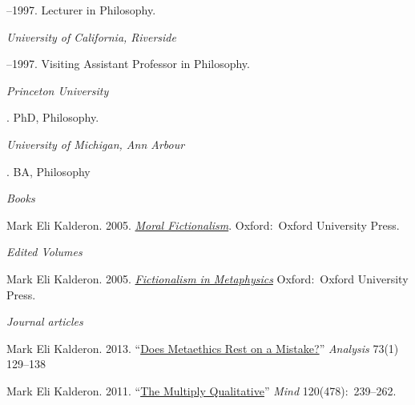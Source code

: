 \documentclass[11pt]{article}
\begin{document}
--1997. Lecturer in Philosophy.

\medskip
\noindent\emph{University of California, Riverside \vspace{0.01in}}

--1997. Visiting Assistant Professor in Philosophy.


\bigskip



\noindent\emph{Princeton University \vspace{0.01in}}

. PhD, Philosophy.

\medskip
\noindent\emph{University of Michigan, Ann Arbour\vspace{0.02in}}

. BA, Philosophy

\bigskip
 
\medskip
\noindent\emph{Books \vspace{0.01in}}

\ind  Mark Eli Kalderon. 2005. \emph{\href{http://ukcatalogue.oup.com/product/9780199275977.do}{Moral Fictionalism}}. Oxford:~Oxford University Press. \vspace{-0.075in}

\medskip
\noindent\emph{Edited Volumes \vspace{0.01in}}

\ind Mark Eli Kalderon. 2005. \emph{\href{http://ukcatalogue.oup.com/product/9780199282180.do}{Fictionalism in Metaphysics}} Oxford:~Oxford University Press. \vspace{-0.075in}
 
\normalsize

\bigskip
\noindent\emph{Journal articles \vspace{0.05in}}
 

\ind Mark Eli Kalderon. 2013. ``\href{http://dx.doi.org/10.1093/analys/ans147}{Does Metaethics Rest on a Mistake?}'' \emph{Analysis} 73(1) 129--138

\ind Mark Eli Kalderon. 2011. ``\href{http://mind.oxfordjournals.org/content/120/478/239.full.pdf+html}{The Multiply Qualitative}'' \emph{Mind} 120(478):~239--262. 
\end{document}

